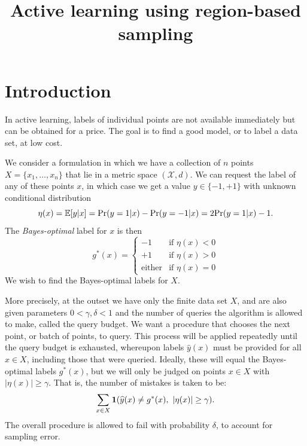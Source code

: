 \documentclass{article}
\title{Active learning using region-based sampling}
\def\pr{{\rm Pr}}
\def\E{{\mathbb E}}
\def\X{{\mathcal X}}
\def\yh{{\widehat{y}}}
\newcommand{\comment}[2]{ {\bf #1 :} #2}
\newcommand{\yoav}[1]{\comment{Yoav}{#1}}
\begin{document}
\maketitle

\section{Introduction}

In active learning, labels of individual points are not available immediately but can be obtained for a price. The goal is to find a good model, or to label a data set, at low cost.

We consider a formulation in which we have a collection of $n$ points $X = \{x_1, \ldots, x_n\}$ that lie in a metric space $(\X, d)$. We can request the label of any of these points $x$, in which case we get a value $y \in \{-1, +1\}$ with unknown conditional distribution
$$ \eta(x) = \E[y | x] = \pr(y=1|x) - \pr(y=-1|x) = 2 \pr(y=1|x) - 1 .$$
The \emph{Bayes-optimal} label for $x$ is then 
$$ g^*(x) = \left\{
\begin{array}{cl}
-1 & \mbox{if $\eta(x) < 0$} \\
+1 & \mbox{if $\eta(x) > 0$} \\
\mbox{either} & \mbox{if $\eta(x)= 0$}
\end{array} \right.
$$
We wish to find the Bayes-optimal labels for $X$.

More precisely, at the outset we have only the finite data set $X$, and are also given parameters $0 < \gamma, \delta < 1$ and the number of queries the algorithm is allowed to make, called the query budget. We want a procedure that chooses the next point, or batch of points, to query. This process will be applied repeatedly until the query budget is exhausted, whereupon labels $\yh(x)$ must be provided for all $x \in X$, including those that were queried. Ideally, these will equal the Bayes-optimal labels $g^*(x)$, but we will only be judged on points $x \in X$ with $|\eta(x)| \geq \gamma$. That is, the number of mistakes is taken to be:
$$ \sum_{x \in X} {\bf 1}(\yh(x) \neq g^*(x),\ |\eta(x)| \geq \gamma) .$$
The overall procedure is allowed to fail with probability $\delta$, to account for sampling error.

\end{document}
